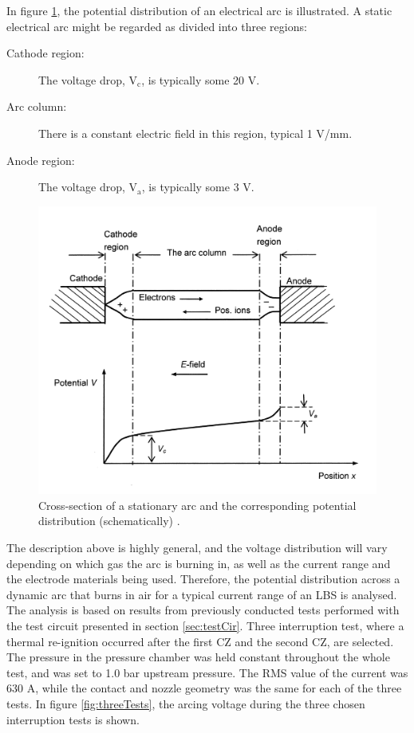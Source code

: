 \documentclass[10pt,b5paper,twoside]{article}
\begin{document}
In figure \ref{fig:potDisArc}, the potential distribution of an electrical arc is illustrated. A static electrical arc might be regarded as divided into three regions:

\begin{description}
\item[Cathode region:] The voltage drop, $\mathrm{V_c}$, is typically some 20 V.
\item[Arc column:]	There is a constant electric field in this region, typical 1 V/mm.
\item[Anode region:] The voltage drop, $\mathrm{V_a}$, is typically some 3 V.
\end{description}

\begin{figure}[H]
\centering
\includegraphics[scale=0.8]{Bilder/Theory/potentialDistArc.png}
\caption{Cross-section of a stationary arc and the corresponding potential distribution (schematically) \cite{bib:HVEbreak}.} \label{fig:potDisArc}
\end{figure}

The description above is highly general, and the voltage distribution will vary depending on which gas the arc is burning in, as well as the current range and the electrode materials being used. Therefore, the potential distribution across a dynamic arc that burns in air for a typical current range of an LBS is analysed. The analysis is based on results from previously conducted tests performed with the test circuit presented in section \ref{sec:testCir}. Three interruption test, where a thermal re-ignition occurred after the first CZ and the second CZ, are selected. The pressure in the pressure chamber was held constant throughout the whole test, and was set to 1.0 bar upstream pressure. The RMS value of the current was 630 A, while the contact and nozzle geometry was the same for each of the three tests. In figure \ref{fig:threeTests}, the arcing voltage during the three chosen interruption tests is shown.
\end{document}
